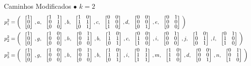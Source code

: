 \documentclass[aspectratio=169,14pt]{beamer} %
\begin{document}
\begin{frame}{Caminhos Modificados}
  \setlength\arraycolsep{2pt}
 $\bullet$ $k=2$
  \small \begin{align*}
  p_1^2&= \left(\colvec{1\\0\\0},a,\colvec{1&1\\0&1\\0&0},b,\colvec{1&0\\1&1\\0&1},c,\colvec{0&0\\1&0\\1&0},d,\colvec{0&0\\0&0\\0&1},e,\colvec{0&1\\0&0\\0&0}\right) \\ 
  p_2^2&= \left(\colvec{1\\0\\0},g,\colvec{1&0\\0&0\\0&0},h,\colvec{0&1\\0&1\\0&0},b,\colvec{1&0\\1&1\\0&1},c,\colvec{0&0\\1&0\\1&0},i,\colvec{0&1\\0&0\\0&0},j,\colvec{1&0\\0&1\\0&1},l,\colvec{0&1\\1&0\\1&0}\right) \\
  p_3^2&= \left(\colvec{1\\0\\0},g,\colvec{1&0\\0&0\\0&0},h,\colvec{0&1\\0&1\\0&0},b,\colvec{1&0\\1&1\\0&1},i,\colvec{0&1\\1&1\\1&1},m,\colvec{1&0\\1&0\\1&0},d,\colvec{0&0\\0&0\\0&1},n,\colvec{0&1\\0&1\\1&0}\right) \\
\end{align*}
\end{frame}
\end{document}
